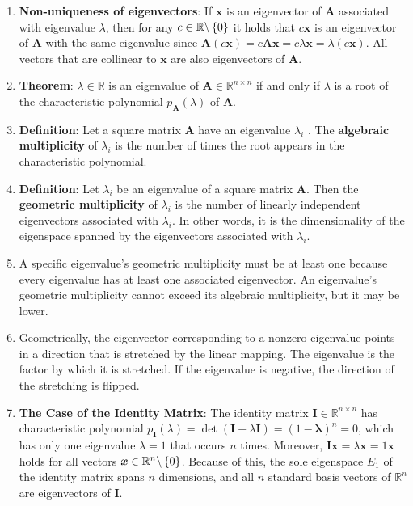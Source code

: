 \begin{enumerate}
    \item \textbf{Non-uniqueness of eigenvectors}: If $\bm{x}$ is an eigenvector of $\bm{A}$ associated with eigenvalue $\lambda$, then for any $c \in \mathbb{R}\backslash \left\{0\right\}$ it holds that $c\bm{x}$ is an eigenvector of $\bm{A}$ with the same eigenvalue since $\bm{A}(c\bm{x}) = c\bm{Ax} = c\lambda\bm{x} = \lambda(c\bm{x})$. All vectors that are collinear to $\bm{x}$ are also eigenvectors of $\bm{A}$.
    \hfill \cite{mfml/book/mml/Deisenroth-Faisal-Ong}

    \item \textbf{Theorem}: $\lambda  \in \mathbb{R}$ is an eigenvalue of $\bm{A} \in \mathbb{R}^{n\times n}$ if and only if $\lambda$  is a root of the characteristic polynomial $p_{\bm{A}}(\lambda )$ of $\bm{A}$.
    \hfill \cite{mfml/book/mml/Deisenroth-Faisal-Ong}

    \item \textbf{Definition}: Let a square matrix $\bm{A}$ have an eigenvalue $\lambda_i$ . 
    The \textbf{algebraic  multiplicity} of $\lambda_i$ is the number of times the root appears in the characteristic polynomial.
    \hfill \cite{mfml/book/mml/Deisenroth-Faisal-Ong}

    \item \textbf{Definition}: Let $\lambda_i$ be an eigenvalue of a square matrix $\bm{A}$. 
    Then the \textbf{geometric multiplicity} of $\lambda_i$ is the number of linearly independent eigenvectors associated with $\lambda_i$. 
    In other words, it is the dimensionality of the eigenspace spanned by the eigenvectors associated with $\lambda_i$.
    \hfill \cite{mfml/book/mml/Deisenroth-Faisal-Ong}

    \item A specific eigenvalue’s geometric multiplicity must be at least one because every eigenvalue has at least one associated eigenvector. 
    An eigenvalue’s geometric multiplicity cannot exceed its algebraic multiplicity, but it may be lower.

    \item Geometrically, the eigenvector corresponding to a nonzero eigenvalue points in a direction that is stretched by the linear mapping.
    The eigenvalue is the factor by which it is stretched. 
    If the eigenvalue is negative, the direction of the stretching is flipped.
    \hfill \cite{mfml/book/mml/Deisenroth-Faisal-Ong}

    \item \textbf{The Case of the Identity Matrix}: The identity matrix $\bm{I} \in \mathbb{R}^{n\times n}$ has characteristic polynomial $p_{\bm{I}} (\lambda ) = \det(\bm{I} -\lambda \bm{I}) = (1-\bm{\lambda }) ^n = 0$, which has only one eigenvalue $\lambda  = 1$ that occurs $n$ times. 
    Moreover, $\bm{Ix} = \lambda \bm{x} = 1\bm{x}$ holds for all vectors $\bm{x} \in \mathbb{R}^n\backslash \left\{0\right\}$. 
    Because of this, the sole eigenspace $E_1$ of the identity matrix spans $n$ dimensions, and all $n$ standard basis vectors of $\mathbb{R}^n$ are eigenvectors of $\bm{I}$.
    \hfill \cite{mfml/book/mml/Deisenroth-Faisal-Ong}


\end{enumerate}

